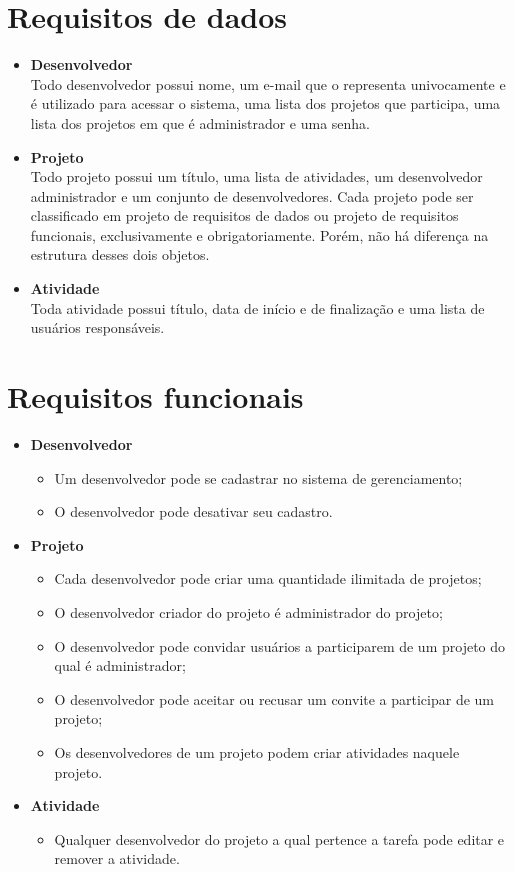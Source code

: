 \documentclass{article}
\begin{document}
\section{Requisitos de dados}
\begin{itemize}
    \item \textbf{Desenvolvedor}
    \\ Todo desenvolvedor possui nome, um e-mail que o representa univocamente e é utilizado para acessar o sistema, uma lista dos projetos que participa, uma lista dos projetos em que é administrador e uma senha.
    \item \textbf{Projeto}
    \\Todo projeto possui um título, uma lista de atividades, um desenvolvedor administrador e um conjunto de desenvolvedores. Cada projeto pode ser classificado em projeto de requisitos de dados ou projeto de requisitos funcionais, exclusivamente e obrigatoriamente. Porém, não há diferença na estrutura desses dois objetos.
    \item \textbf{Atividade}
    \\Toda atividade possui título, data de início e de finalização e uma lista de usuários responsáveis.
\end{itemize}
\section{Requisitos funcionais}
\begin{itemize}
    \item \textbf{Desenvolvedor}
    \begin{itemize}
        \item Um desenvolvedor pode se cadastrar no sistema de gerenciamento;
        \item O desenvolvedor pode desativar seu cadastro.
    \end{itemize}
    \item \textbf{Projeto}
    \begin{itemize}
        \item Cada desenvolvedor pode criar uma quantidade ilimitada de projetos;
        \item O desenvolvedor criador do projeto é administrador do projeto;
        \item O desenvolvedor pode convidar usuários a participarem de um projeto do qual é administrador;
        \item O desenvolvedor pode aceitar ou recusar um convite a participar de um projeto;
        \item Os desenvolvedores de um projeto podem criar atividades naquele projeto.
    \end{itemize}
    \item \textbf{Atividade}
    \begin{itemize}
        \item Qualquer desenvolvedor do projeto a qual pertence a tarefa pode editar e remover a atividade.
    \end{itemize}
\end{itemize}
\end{document}

